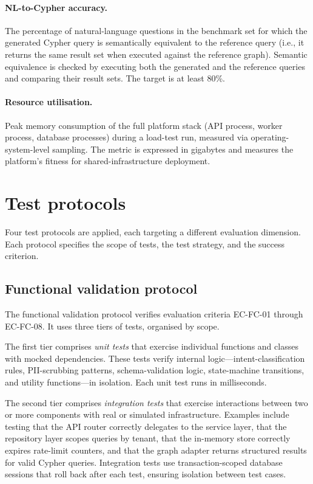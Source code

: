 \documentclass[a4paper,noexaminfo]{sapthesis}
\begin{document}
\paragraph{NL-to-Cypher accuracy.}
The percentage of natural-language questions in the benchmark set for
which the generated Cypher query is semantically equivalent to the
reference query (i.e., it returns the same result set when executed
against the reference graph).  Semantic equivalence is checked by
executing both the generated and the reference queries and comparing
their result sets.  The target is at least 80\%.

\paragraph{Resource utilisation.}
Peak memory consumption of the full platform stack (API process, worker
process, database processes) during a load-test run, measured via
operating-system-level sampling.  The metric is expressed in gigabytes
and measures the platform's fitness for shared-infrastructure deployment.


\section{Test protocols}
\label{sec:test-protocols}

Four test protocols are applied, each targeting a different evaluation
dimension.  Each protocol specifies the scope of tests, the test
strategy, and the success criterion.

\subsection{Functional validation protocol}
\label{sec:functional-protocol}

The functional validation protocol verifies evaluation criteria EC-FC-01
through EC-FC-08.  It uses three tiers of tests, organised by scope.

The first tier comprises \emph{unit tests} that exercise individual
functions and classes with mocked dependencies.  These tests verify
internal logic---intent-classification rules, PII-scrubbing patterns,
schema-validation logic, state-machine transitions, and utility
functions---in isolation.  Each unit test runs in milliseconds.

The second tier comprises \emph{integration tests} that exercise
interactions between two or more components with real or simulated
infrastructure.  Examples include testing that the API router correctly
delegates to the service layer, that the repository layer scopes queries
by tenant, that the in-memory store correctly expires rate-limit counters,
and that the graph adapter returns structured results for valid Cypher
queries.  Integration tests use transaction-scoped database sessions that
roll back after each test, ensuring isolation between test cases.
\end{document}

